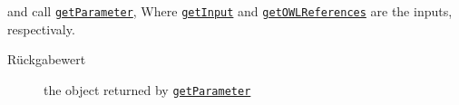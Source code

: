 \begin{description}
 and call \texttt{\hyperlink{ontologyFramework.OFEventManagement.OFEventParameterInterface.getParameter(java.lang.Object,ontologyFramework.OFContextManagement.OWLReferences)}{getParameter}}, Where \texttt{\hyperlink{ontologyFramework.OFEventManagement.OFEventParameterDefinition.getInput()}{getInput}}
 and \texttt{\hyperlink{ontologyFramework.OFEventManagement.OFEventParameterDefinition.getOWLReferences()}{getOWLReferences}} are the inputs, respectivaly.
\begin{description}
\item[Rückgabewert] 
the object returned by \texttt{\hyperlink{ontologyFramework.OFEventManagement.OFEventParameterInterface.getParameter(java.lang.Object,ontologyFramework.OFContextManagement.OWLReferences)}{getParameter}}
\end{description}
\end{description}
